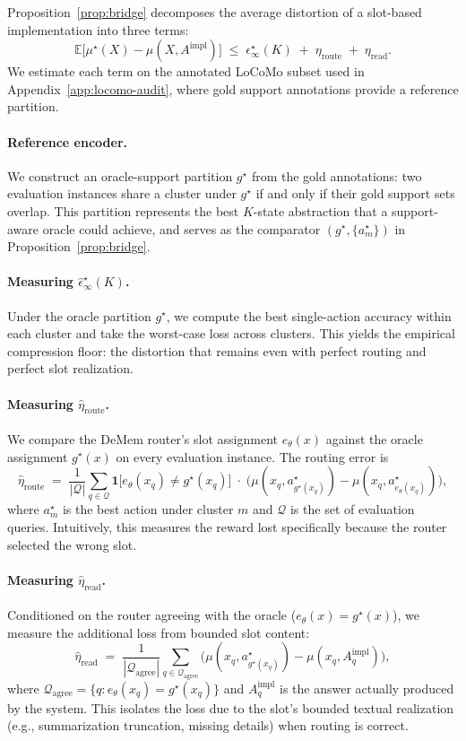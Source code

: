 \documentclass{article}
\theoremstyle{plain}
\theoremstyle{definition}
\theoremstyle{remark}
\newcommand{\cQ}{\mathcal{Q}}
\newcommand{\eps}{\epsilon}
\newcommand{\EE}{\mathbb{E}}
\begin{document}
Proposition~\ref{prop:bridge} decomposes the average distortion of a slot-based implementation into three terms:
\[
\EE\bigl[\mu^\star(X)-\mu(X,A^{\mathrm{impl}})\bigr]
\;\le\;
\eps^\star_\infty(K)
\;+\;
\eta_{\mathrm{route}}
\;+\;
\eta_{\mathrm{read}}.
\]
We estimate each term on the annotated LoCoMo subset used in Appendix~\ref{app:locomo-audit}, where gold support annotations provide a reference partition.

\paragraph{Reference encoder.}
We construct an oracle-support partition $g^\star$ from the gold annotations: two evaluation instances share a cluster under $g^\star$ if and only if their gold support sets overlap.
This partition represents the best $K$-state abstraction that a support-aware oracle could achieve, and serves as the comparator $(g^\star,\{a^\star_m\})$ in Proposition~\ref{prop:bridge}.

\paragraph{Measuring $\hat\eps^\star_\infty(K)$.}
Under the oracle partition $g^\star$, we compute the best single-action accuracy within each cluster and take the worst-case loss across clusters.
This yields the empirical compression floor: the distortion that remains even with perfect routing and perfect slot realization.

\paragraph{Measuring $\hat\eta_{\mathrm{route}}$.}
We compare the DeMem router's slot assignment $e_\theta(x)$ against the oracle assignment $g^\star(x)$ on every evaluation instance.
The routing error is
\[
\hat\eta_{\mathrm{route}}
\;=\;
\frac{1}{|\cQ|}\sum_{q\in\cQ}
\mathbf{1}\bigl[e_\theta(x_q)\neq g^\star(x_q)\bigr]
\;\cdot\;
\bigl(\mu(x_q,a^\star_{g^\star(x_q)})-\mu(x_q,a^\star_{e_\theta(x_q)})\bigr),
\]
where $a^\star_m$ is the best action under cluster $m$ and $\cQ$ is the set of evaluation queries.
Intuitively, this measures the reward lost specifically because the router selected the wrong slot.

\paragraph{Measuring $\hat\eta_{\mathrm{read}}$.}
Conditioned on the router agreeing with the oracle ($e_\theta(x)=g^\star(x)$), we measure the additional loss from bounded slot content:
\[
\hat\eta_{\mathrm{read}}
\;=\;
\frac{1}{|\cQ_{\mathrm{agree}}|}
\sum_{q\in\cQ_{\mathrm{agree}}}
\bigl(\mu(x_q,a^\star_{g^\star(x_q)})-\mu(x_q,A^{\mathrm{impl}}_q)\bigr),
\]
where $\cQ_{\mathrm{agree}}=\{q:e_\theta(x_q)=g^\star(x_q)\}$ and $A^{\mathrm{impl}}_q$ is the answer actually produced by the system.
This isolates the loss due to the slot's bounded textual realization (e.g., summarization truncation, missing details) when routing is correct.
\end{document}

